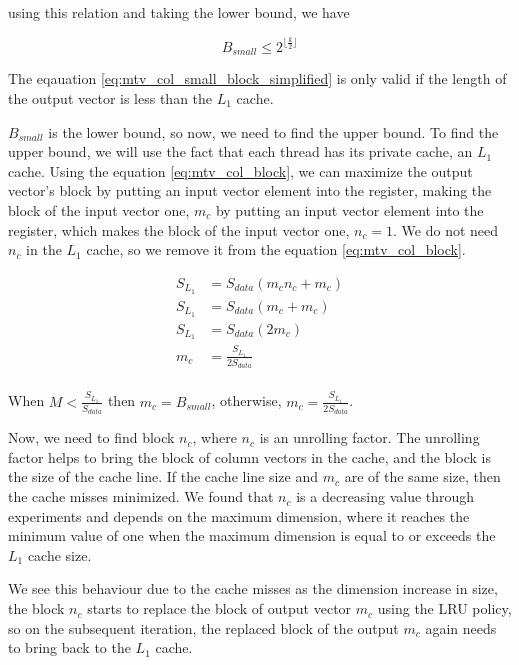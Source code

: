 using this relation and taking the lower bound, we have

\begin{equation}
    B_{small} \leq 2^{\lfloor \frac{k}{2} \rfloor}
    \label{eq:mtv_col_small_block_simplified} 
\end{equation}

The eqauation \ref{eq:mtv_col_small_block_simplified} is only valid if the length of the output
vector is less than the $L_1$ cache.

$B_{small}$ is the lower bound, so now, we need to find the upper bound. 
To find the upper bound, we will use the fact that each thread has its 
private cache, an $L_1$ cache. Using the equation \ref{eq:mtv_col_block}, 
we can maximize the output vector's block by putting an 
input vector element into the register, making the block of 
the input vector one, $m_c$ by putting an input vector element into the 
register, which makes the block of the input vector one, $n_c = 1$. We do not need $n_c$
in the $L_1$ cache, so we remove it from the equation \ref{eq:mtv_col_block}.

\begin{align*}
    S_{L_1} &= S_{data}(m_cn_c + m_c)\\
    S_{L_1} &= S_{data}(m_c + m_c)\\
    S_{L_1} &= S_{data}(2m_c)\\
    m_c &= \frac{S_{L_1}}{2S_{data}}\\
\end{align*}

When $M < \frac{S_{L_1}}{S_{data}}$ then $m_c = B_{small}$, otherwise, $m_c = \frac{S_{L_1}}{2S_{data}}$.

\vspace*{0.5 cm}
Now, we need to find block $n_c$, where $n_c$ is an unrolling factor. 
The unrolling factor helps to bring the block of column vectors 
in the cache, and the block is the size of the cache line. 
If the cache line size and $m_c$ are of the same size, then the 
cache misses minimized. We found that $n_c$ is a decreasing value 
through experiments and depends on the maximum dimension, 
where it reaches the minimum value of one when the maximum dimension 
is equal to or exceeds the $L_1$ cache size.

We see this behaviour due to the cache misses as the dimension 
increase in size, the block $n_c$ starts to replace the block of 
output vector $m_c$ using the LRU policy, so on the subsequent iteration, 
the replaced block of the output $m_c$ again needs to bring back to the $L_1$ cache.

